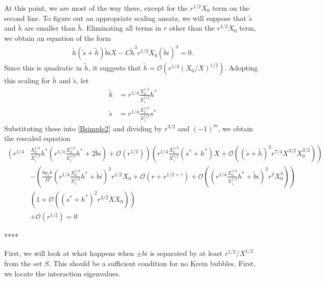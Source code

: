 \documentclass[thesis.tex]{subfiles}
\begin{document}
At this point, we are most of the way there, except for the $r^{1/2}X_0$ term on the second line. To figure out an appropriate scaling ansatz, we will suppose that $\tilde{s}$ and $\tilde{h}$ are smaller than $\tilde{h}$. Eliminating all terms in $r$ other than the $r^{1/2}X_0$ term, we obtain an equation of the form
\begin{equation}\label{Bsimpleansatz1}
\begin{aligned}
\tilde{h} (\tilde{s} + \tilde{h}) \tilde{b} i X 
- C \tilde{h}^3 r^{1/2} X_0 (\tilde{b} i)^3 = 0.
\end{aligned}
\end{equation} 
Since this is quadratic in $\tilde{h}$, it suggests that $\tilde{h} = \mathcal{O}(r^{1/4}(X_0/X)^{1/2})$. Adopting this scaling for $\tilde{h}$ and $\tilde{s}$, let
\begin{align*}
\tilde{h} &= r^{1/4}\frac{X_0^{1/2}}{X_1^{1/2}} h^* \\
\tilde{s} &= r^{1/4}\frac{X_0^{1/2}}{X_1^{1/2}} s^*
\end{align*}
Substituting these into \cref{Bsimple2} and dividing by $r^{3/2}$ and $(-1)^m$, we obtain the rescaled equation
\begin{equation}\label{Bsimple5}
\begin{aligned}
\left( r^{1/4}\right.&\frac{X_0^{1/2}}{X_1^{1/2}} h^* \left.\left( r^{1/4}\frac{X_0^{1/2}}{X_1^{1/2}} h^* + 2 \tilde{b} i \right) + \mathcal{O}( r^{1/2} )\right)
\left( r^{1/4}\frac{X_0^{1/2}}{X_1^{1/2}} (s^* + h^*)X + \mathcal{O}\left( (\tilde{s} + \tilde{h})^3 r^{7/4} X^{3/2}X_0^{3/2} \right) \right) \\ 
&- \left(\frac{8 p_1 \tilde{k}}{M} \left( r^{1/4}\frac{X_0^{1/2}}{X_1^{1/2}} h^* + \tilde{b}i\right)^3 r^{1/2} X_0 + \mathcal{O}(r + r^{1/2 + \gamma}) + \mathcal{O}\left( \left(r^{1/4}\frac{X_0^{1/2}}{X_1^{1/2}} h^* + \tilde{b}i \right)^3 r^2 X_0^3  \right) \right) \\
&\left( 1 + \mathcal{O}\left( (s^* + h^*)^2 r^{3/2} X X_0 \right) \right) \\
&+ \mathcal{O}( r^{1/2} ) = 0
\end{aligned}
\end{equation} 
 
****

First, we will look at what happens when $\pm bi$ is separated by at least $r^{1/2}/X^{1/2}$ from the set $S$. This should be a sufficient condition for no Krein bubbles. First, we locate the interaction eigenvalues.
\end{document}
